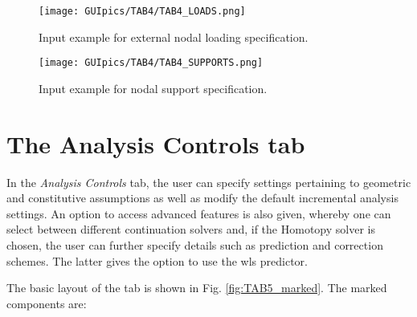 \begin{figure}
	\centering
	\texttt{[image: GUIpics/TAB4/TAB4\_LOADS.png]}
	\caption{Input example for external nodal loading specification.}
	\label{fig:TAB4_LOADS}
\end{figure}

\begin{figure}
	\centering
	\texttt{[image: GUIpics/TAB4/TAB4\_SUPPORTS.png]}
	\caption{Input example for nodal support specification.}
		\label{fig:TAB4_SUPPORTS}
\end{figure}

\section{The Analysis Controls tab}

In the \textit{Analysis Controls} tab, the user can specify settings pertaining 
to geometric and constitutive assumptions as well as modify the default 
incremental analysis settings. An option to access advanced features is also 
given, whereby one can select between different continuation solvers and, if 
the Homotopy solver is chosen, the user can further specify details such as 
prediction and correction schemes. The latter gives the option to use the 
\acrshort{wls} predictor. 

The basic layout of the tab is shown in Fig. \ref{fig:TAB5_marked}. The marked 
components are:

